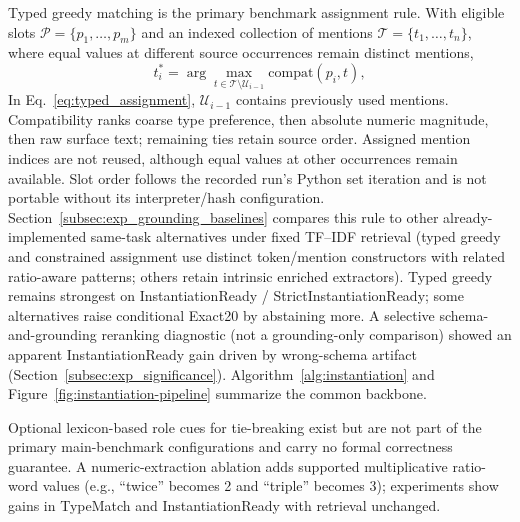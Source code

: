 \documentclass[pdflatex,iicol,sn-basic,Numbered]{sn-jnl}
\begin{document}
Typed greedy matching is the primary benchmark assignment rule. With eligible slots $\mathcal{P}=\{p_1,\dots,p_m\}$ and an indexed collection of mentions $\mathcal{T}=\{t_1,\dots,t_n\}$, where equal values at different source occurrences remain distinct mentions,
\begin{equation}
t_i^{*} = \arg\max_{t \in \mathcal{T}\setminus \mathcal{U}_{i-1}} \mathrm{compat}(p_i,t),
\label{eq:typed_assignment}
\end{equation}
In Eq.~\eqref{eq:typed_assignment}, $\mathcal{U}_{i-1}$ contains previously used mentions. Compatibility ranks coarse type preference, then absolute numeric magnitude, then raw surface text; remaining ties retain source order. Assigned mention indices are not reused, although equal values at other occurrences remain available. Slot order follows the recorded run's Python set iteration and is not portable without its interpreter/hash configuration. Section~\ref{subsec:exp_grounding_baselines} compares this rule to other already-implemented same-task alternatives under fixed TF--IDF retrieval (typed greedy and constrained assignment use distinct token/mention constructors with related ratio-aware patterns; others retain intrinsic enriched extractors). Typed greedy remains strongest on InstantiationReady / StrictInstantiationReady; some alternatives raise conditional Exact20 by abstaining more. A selective schema-and-grounding reranking diagnostic (not a grounding-only comparison) showed an apparent InstantiationReady gain driven by wrong-schema artifact (Section~\ref{subsec:exp_significance}). Algorithm~\ref{alg:instantiation} and Figure~\ref{fig:instantiation-pipeline} summarize the common backbone.

Optional lexicon-based role cues for tie-breaking exist but are not part of the primary main-benchmark configurations and carry no formal correctness guarantee. A numeric-extraction ablation adds supported multiplicative ratio-word values (e.g., ``twice'' becomes 2 and ``triple'' becomes 3); experiments show gains in TypeMatch and InstantiationReady with retrieval unchanged.
\end{document}
